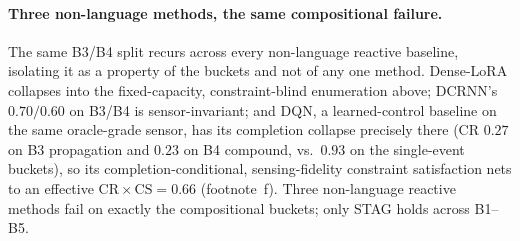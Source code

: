 \paragraph{Three non-language methods, the same compositional failure.}
The same B3/B4 split recurs across every non-language reactive baseline, isolating it as a property of
the buckets and not of any one method. Dense-LoRA collapses into the fixed-capacity, constraint-blind enumeration above;
DCRNN's $0.70/0.60$ on B3/B4 is sensor-invariant; and DQN, a learned-control baseline on the same
oracle-grade sensor, has its completion collapse precisely there (CR $0.27$ on B3 propagation and $0.23$
on B4 compound, vs.\ $0.93$ on the single-event buckets), so its completion-conditional, sensing-fidelity
constraint satisfaction nets to an effective $\mathrm{CR}\times\mathrm{CS}=0.66$ (footnote~f). Three
non-language reactive methods fail on exactly the compositional buckets; only STAG holds across B1--B5.
